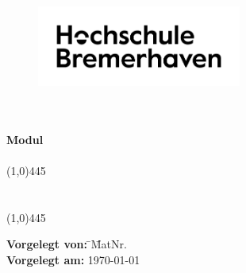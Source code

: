 \setmainfont{TeX Gyre Adventor}
\thispagestyle{empty}
\begin{figure}[h!]
	\centering
	\includegraphics[width=0.6\textwidth]{./images/hs-logo.png}
\end{figure}
\begin{center}
	\large{\textbf{\department}}\\
	\large{\textbf{\studyprogram}}\\
	\vspace{1cm}
	{
		\large{\textbf{Modul\\ \modulname}}\\
	}
	\vspace*{\fill}
	\line(1,0){445}\\
	\doublespacing
	\textbf{\Large{\thetitle}}\\
	\textbf{\large{\thesubtitle}}\\
	\line(1,0){445}\\
\end{center}
\vspace*{\fill}
\onehalfspacing
\small{
	\begin{flushleft}
		\begin{tabbing}
			\textbf{Vorgelegt von:} \hspace*{0.8cm}\= \theauthor \hspace*{\myspace}\= MatNr. \matriculationnumber \\


			\textbf{Vorgelegt am:} \> \today\\
			{
				\auditor\\
			}
		\end{tabbing}
	\end{flushleft}}
\setmainfont{TeX Gyre Termes}